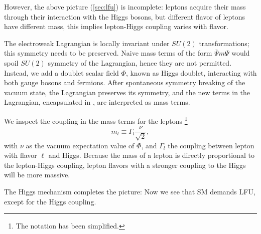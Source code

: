 However, the above picture (\autoref{sec:lfu}) is incomplete:
leptons acquire their mass through their interaction with the Higgs bosons,
but different flavor of leptons have different mass, this implies lepton-Higgs
coupling varies with flavor.

The electroweak Lagrangian is locally invariant under $SU(2)$ transformations;
this symmetry needs to be preserved.
Naive mass terms of the form $\bar{\Psi} m \Psi$
would spoil $SU(2)$ symmetry of the Lagrangian, hence they are not permitted.
Instead, we add a doublet scalar field $\Phi$, known as Higgs doublet,
interacting with both gauge bosons and fermions.
After spontaneous symmetry breaking of the vacuum state, the Lagrangian
preserves its symmetry, and the new terms in the Lagrangian, encapsulated in
, are interpreted as mass terms.

We inspect the coupling in the mass terms for the
leptons \cite{Langacker:2010zza}\footnote{
    The notation has been simplified.
}
\begin{equation}
    m_l \equiv \Gamma_l \frac{\nu}{\sqrt{2}},
\end{equation}
with $\nu$ as the vacuum expectation value of $\Phi$, and $\Gamma_l$ the
coupling between lepton with flavor $\ell$ and Higgs.
Because the mass of a lepton is directly proportional to the lepton-Higgs
coupling, lepton flavors with a stronger coupling to the Higgs will be more
massive.

The Higgs mechanism completes the picture:
Now we see that SM demands LFU, except for the Higgs coupling.
